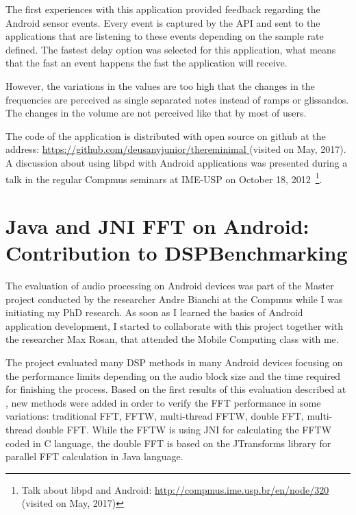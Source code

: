 The first experiences with this application provided feedback regarding the Android sensor events.
Every event is captured by the API and sent to the applications that are listening to these events depending on the sample rate defined.
The fastest delay option was selected for this application, what means that the fast an event happens the fast the application will receive.

However, the variations in the values are too high that the changes in the frequencies are perceived as single separated notes instead of ramps or glissandos.
The changes in the volume are not perceived like that by most of users. %

The code of the application is distributed with open source on github at the address: \url{https://github.com/deusanyjunior/thereminimal
} (visited on May, 2017).
A discussion about using libpd with Android applications was presented during a talk in the regular Compmus seminars at IME-USP on October 18, 2012~\footnote{Talk about libpd and Android: \url{http://compmus.ime.usp.br/en/node/320} (visited on May, 2017)}.


\section{Java and JNI FFT on Android: Contribution to DSPBenchmarking}
\label{apesec:appdspbenchmarking}

The evaluation of audio processing on Android devices was part of the Master project conducted by the researcher Andre Bianchi at the Compmus while I was initiating my PhD research.
As soon as I learned the basics of Android application development, I started to collaborate with this project together with the researcher Max Rosan, that attended the Mobile Computing class with me.

The project evaluated many DSP methods in many Android devices focusing on the performance limits depending on the audio block size and the time required for finishing the process.
Based on the first results of this evaluation described at \cite{Bianchi2012ontheperformance}, new methods were added in order to verify the FFT performance in some variations:
traditional FFT, FFTW, multi-thread FFTW, double FFT, multi-thread double FFT.
While the FFTW is using JNI for calculating the FFTW coded in C language, the double FFT is based on the JTransforms library for parallel FFT calculation in Java language.

